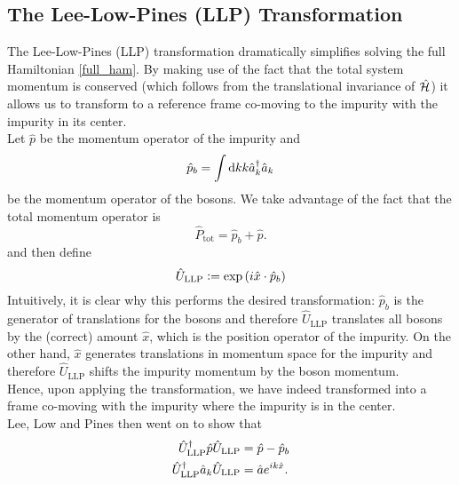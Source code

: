 \subsection{The Lee-Low-Pines (LLP) Transformation}
The Lee-Low-Pines (LLP) transformation \cite{LLP} dramatically simplifies solving the full Hamiltonian \ref{full_ham}. By making use of the fact that the total system momentum is conserved (which follows from the translational invariance of $\hat{\mathcal{H}}$) it allows us to transform to a reference frame co-moving to the impurity with the impurity in its center. \\
Let $\hat p$ be the momentum operator of the impurity and \begin{equation}\hat p_b= \int\mathrm d k k \hat a^\dagger_k\hat a_k\end{equation} be the momentum operator of the bosons. 
We take advantage of the fact that the total momentum operator is
\begin{equation}
\hat P_{\mathrm{tot}} = \hat p_b + \hat p.
\end{equation}
and then define
\begin{equation}
\hat U_{\mathrm{LLP}}\vcentcolon= \exp\left(i\hat x\cdot \hat p_b\right)
\end{equation}
Intuitively, it is clear why this performs the desired transformation: $\hat p_b$ is the generator of translations for the bosons and therefore $\hat U_{\mathrm{LLP}}$ translates all bosons by the (correct) amount $\hat x$, which is the position operator of the impurity. On the other hand, $\hat x$ generates translations in momentum space for the impurity and therefore $\hat U_{\mathrm{LLP}}$ shifts the impurity momentum by the boson momentum. \\
Hence, upon applying the transformation, we have indeed transformed into a frame co-moving with the impurity where the impurity is in the center.\\
Lee, Low and Pines \cite[eq. (8)]{LLP} then went on to show that
\begin{subequations}
\begin{align}
\hat U_{\mathrm{LLP}}^\dagger \hat p \hat U_{\mathrm{LLP}} &= \hat p -\hat p_b\\
\hat U_{\mathrm{LLP}}^\dagger \hat a_k \hat U_{\mathrm{LLP}} &= \hat a e^{i k\hat x}.
\end{align}
\end{subequations}
